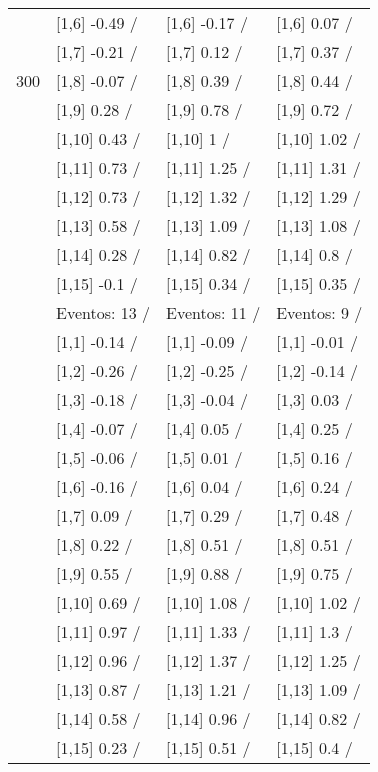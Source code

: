 \begin{table}
\begin{tabular}[t]{llll}
 & {}[1,6] -0.49  / & {}[1,6] -0.17  / & {}[1,6] 0.07  /\\
 & {}[1,7] -0.21  / & {}[1,7] 0.12  / & {}[1,7] 0.37  /\\
300 & {}[1,8] -0.07  / & {}[1,8] 0.39  / & {}[1,8] 0.44  /\\
\addlinespace
 & {}[1,9] 0.28  / & {}[1,9] 0.78  / & {}[1,9] 0.72  /\\
 & {}[1,10] 0.43  / & {}[1,10] 1  / & {}[1,10] 1.02  /\\
 & {}[1,11] 0.73  / & {}[1,11] 1.25  / & {}[1,11] 1.31  /\\
 & {}[1,12] 0.73  / & {}[1,12] 1.32  / & {}[1,12] 1.29  /\\
 & {}[1,13] 0.58  / & {}[1,13] 1.09  / & {}[1,13] 1.08  /\\
\addlinespace
 & {}[1,14] 0.28  / & {}[1,14] 0.82  / & {}[1,14] 0.8  /\\
 & {}[1,15] -0.1  / & {}[1,15] 0.34  / & {}[1,15] 0.35  /\\
 & Eventos:  13 / & Eventos:  11 / & Eventos:  9 /\\
 & {}[1,1] -0.14  / & {}[1,1] -0.09  / & {}[1,1] -0.01  /\\
 & {}[1,2] -0.26  / & {}[1,2] -0.25  / & {}[1,2] -0.14  /\\
\addlinespace
 & {}[1,3] -0.18  / & {}[1,3] -0.04  / & {}[1,3] 0.03  /\\
 & {}[1,4] -0.07  / & {}[1,4] 0.05  / & {}[1,4] 0.25  /\\
 & {}[1,5] -0.06  / & {}[1,5] 0.01  / & {}[1,5] 0.16  /\\
 & {}[1,6] -0.16  / & {}[1,6] 0.04  / & {}[1,6] 0.24  /\\
 & {}[1,7] 0.09  / & {}[1,7] 0.29  / & {}[1,7] 0.48  /\\
\addlinespace
500 & {}[1,8] 0.22  / & {}[1,8] 0.51  / & {}[1,8] 0.51  /\\
 & {}[1,9] 0.55  / & {}[1,9] 0.88  / & {}[1,9] 0.75  /\\
 & {}[1,10] 0.69  / & {}[1,10] 1.08  / & {}[1,10] 1.02  /\\
 & {}[1,11] 0.97  / & {}[1,11] 1.33  / & {}[1,11] 1.3  /\\
 & {}[1,12] 0.96  / & {}[1,12] 1.37  / & {}[1,12] 1.25  /\\
\addlinespace
 & {}[1,13] 0.87  / & {}[1,13] 1.21  / & {}[1,13] 1.09  /\\
 & {}[1,14] 0.58  / & {}[1,14] 0.96  / & {}[1,14] 0.82  /\\
 & {}[1,15] 0.23  / & {}[1,15] 0.51  / & {}[1,15] 0.4  /\\
\bottomrule
\end{tabular}
\end{table}
